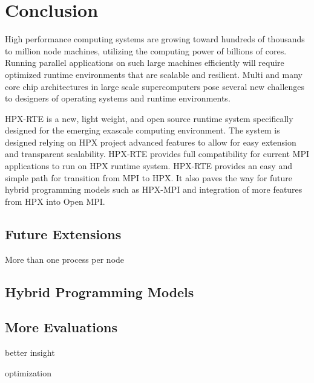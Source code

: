 \chapter{Conclusion}
\label{sec:Conclusion}

High performance computing systems are growing toward hundreds of thousands to million node machines, utilizing the computing power of billions of cores. Running parallel applications on such large machines efficiently will require optimized runtime environments that are scalable and resilient. Multi and many core chip architectures in large scale supercomputers pose several new challenges to designers of operating systems and runtime environments.

HPX-RTE is a new, light weight, and open source runtime system specifically designed for the emerging exascale computing environment. The system is designed relying on HPX project advanced features to allow for easy extension and transparent scalability. HPX-RTE provides full compatibility for current MPI applications to run on HPX runtime system. HPX-RTE provides an easy and simple path for transition from MPI to HPX. It also paves the way for future hybrid programming models such as HPX-MPI and integration of more features from HPX into Open MPI.

\section{Future Extensions}
More than one process per node

\section{Hybrid Programming Models}

\section{More Evaluations}
better insight

optimization
